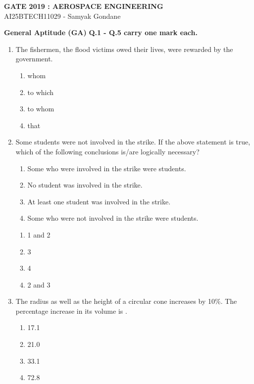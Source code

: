 \documentclass{article}
\begin{document}
\begin{center}
\large
    \textbf{GATE 2019 : AEROSPACE ENGINEERING}\\
    AI25BTECH11029 - Samyak Gondane
\end{center}

\textbf{General Aptitude (GA)}
\textbf{Q.1 - Q.5 carry one mark each.}

\begin{enumerate}[leftmargin=*]
\item The fishermen, \underline{\hspace{1.5cm}} the flood victims owed their lives, were rewarded by the government.
\begin{multicols}{4}
\begin{enumerate}
\item whom
\item to which
\item to whom
\item that
\end{enumerate}
\end{multicols}

\item Some students were not involved in the strike. If the above statement is true, which of the following conclusions is/are logically necessary?
\begin{enumerate}
\item Some who were involved in the strike were students.
\item No student was involved in the strike.
\item At least one student was involved in the strike.
\item Some who were not involved in the strike were students.
\end{enumerate}
\begin{multicols}{4}
\begin{enumerate}
\item 1 and 2
\item 3
\item 4
\item 2 and 3
\end{enumerate}
\end{multicols}

\item The radius as well as the height of a circular cone increases by 10\%. The percentage increase in its volume is \underline{\hspace{1.5cm}}.
\begin{multicols}{4}
\begin{enumerate}
\item 17.1
\item 21.0
\item 33.1
\item 72.8
\end{enumerate}
\end{multicols}


\end{enumerate}
\end{document}
